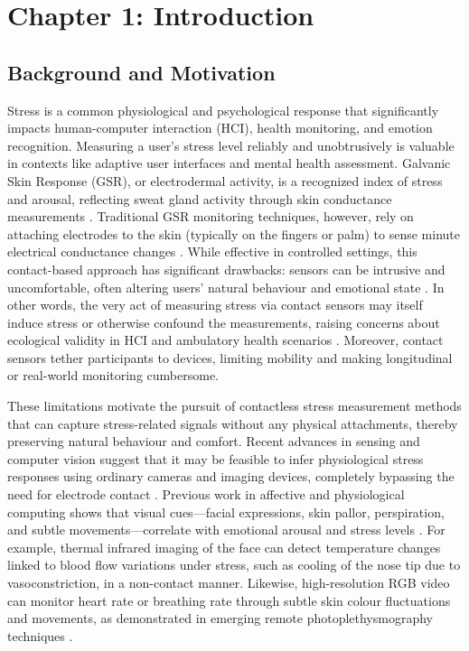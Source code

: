 \documentclass[11pt,a4paper]{report}
\begin{document}
\label{chap:1}
\chapter{Chapter 1: Introduction}

\section{Background and Motivation}

Stress is a common physiological and psychological response that significantly impacts human-computer interaction (HCI), health monitoring, and emotion recognition. Measuring a user's stress level reliably and unobtrusively is valuable in contexts like adaptive user interfaces and mental health assessment. Galvanic Skin Response (GSR), or electrodermal activity, is a recognized index of stress and arousal, reflecting sweat gland activity through skin conductance measurements \cite{Boucsein2012}. Traditional GSR monitoring techniques, however, rely on attaching electrodes to the skin (typically on the fingers or palm) to sense minute electrical conductance changes \cite{Fowles1981}. While effective in controlled settings, this contact-based approach has significant drawbacks: sensors can be intrusive and uncomfortable, often altering users' natural behaviour and emotional state \cite{Cacioppo2007}. In other words, the very act of measuring stress via contact sensors may itself induce stress or otherwise confound the measurements, raising concerns about ecological validity in HCI and ambulatory health scenarios \cite{Wilhelm2010}. Moreover, contact sensors tether participants to devices, limiting mobility and making longitudinal or real-world monitoring cumbersome.

These limitations motivate the pursuit of contactless stress measurement methods that can capture stress-related signals without any physical attachments, thereby preserving natural behaviour and comfort. Recent advances in sensing and computer vision suggest that it may be feasible to infer physiological stress responses using ordinary cameras and imaging devices, completely bypassing the need for electrode contact \cite{Picard2001}. Previous work in affective and physiological computing shows that visual cues—facial expressions, skin pallor, perspiration, and subtle movements—correlate with emotional arousal and stress levels \cite{Healey2005}. For example, thermal infrared imaging of the face can detect temperature changes linked to blood flow variations under stress, such as cooling of the nose tip due to vasoconstriction, in a non-contact manner. Likewise, high-resolution RGB video can monitor heart rate or breathing rate through subtle skin colour fluctuations and movements, as demonstrated in emerging remote photoplethysmography techniques \cite{Poh2010}.
\end{document}
